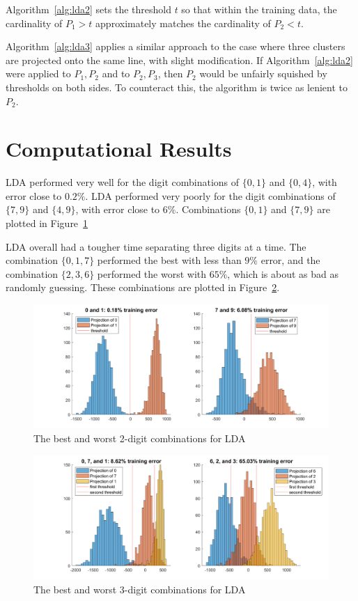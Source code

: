 \documentclass{article}
\begin{document}
Algorithm~\ref{alg:lda2} sets the threshold $t$ so that within the training data, the cardinality of $P_1 > t$ approximately matches the cardinality of $P_2 < t$.

Algorithm~\ref{alg:lda3} applies a similar approach to the case where three clusters are projected onto the same line, with slight modification. If Algorithm~\ref{alg:lda2} were applied to $P_1,P_2$ and to $P_2,P_3$, then $P_2$ would be unfairly squished by thresholds on both sides. To counteract this, the algorithm is twice as lenient to $P_2$.



\section{Computational Results}



LDA performed very well for the digit combinations of $\{0,1\}$ and $\{0,4\}$, with error close to $0.2\%$. LDA performed very poorly for the digit combinations of $\{7,9\}$ and $\{4,9\}$, with error close to $6\%$. Combinations $\{0,1\}$ and $\{7,9\}$ are plotted in Figure~\ref{fig:bestworst}

LDA overall had a tougher time separating three digits at a time. The combination $\{0,1,7\}$ performed the best with less than $9\%$ error, and the combination $\{2,3,6\}$ performed the worst with $65\%$, which is about as bad as randomly guessing. These combinations are plotted in Figure~\ref{fig:triple}.


\begin{figure}[!h]
	\centering
	\includegraphics[scale=0.6]{figs/bestworst}
	\caption{The best and worst 2-digit combinations for LDA}
	\label{fig:bestworst}
\end{figure}

\begin{figure}[!h]
	\centering
	\includegraphics[scale=0.6]{figs/bestworst3}
	\caption{The best and worst 3-digit combinations for LDA}
	\label{fig:triple}
\end{figure}
\end{document}
